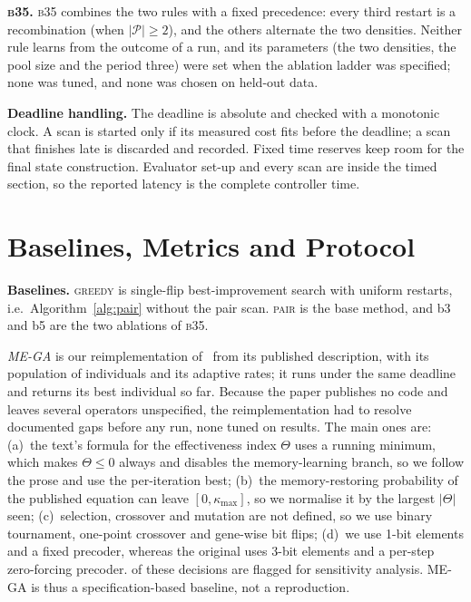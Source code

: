 \documentclass[runningheads]{llncs}
\newcommand{\bts}{\textsc{b35}}
\begin{document}
\textbf{\bts{}.} \bts{} combines the two rules with a fixed precedence: every third restart is a recombination (when $|\mathcal P|\ge2$), and the others alternate the two densities. Neither rule learns from the outcome of a run, and its parameters (the two densities, the pool size and the period three) were set when the ablation ladder was specified; none was tuned, and none was chosen on held-out data.

\textbf{Deadline handling.} The deadline is absolute and checked with a monotonic clock. A scan is started only if its measured cost fits before the deadline; a scan that finishes late is discarded and recorded. Fixed time reserves keep room for the final state construction. Evaluator set-up and every scan are inside the timed section, so the reported latency is the complete controller time.

\section{Baselines, Metrics and Protocol}\label{sec:protocol}
\textbf{Baselines.} \textsc{greedy} is single-flip best-improvement search with uniform restarts, i.e.\ Algorithm~\ref{alg:pair} without the pair scan. \textsc{pair} is the base method, and b3 and b5 are the two ablations of \bts{}.

\emph{ME-GA} is our reimplementation of~\cite{zardi2024memory} from its published description, with its population of  individuals and its adaptive rates; it runs under the same deadline and returns its best individual so far. Because the paper publishes no code and leaves several operators unspecified, the reimplementation had to resolve  documented gaps before any run, none tuned on results. The main ones are: (a)~the text's formula for the effectiveness index $\Theta$ uses a running minimum, which makes $\Theta\le0$ always and disables the memory-learning branch, so we follow the prose and use the per-iteration best; (b)~the memory-restoring probability of the published equation can leave $[0,\kappa_{\max}]$, so we normalise it by the largest $|\Theta|$ seen; (c)~selection, crossover and mutation are not defined, so we use binary tournament, one-point crossover and gene-wise bit flips; (d)~we use 1-bit elements and a fixed precoder, whereas the original uses 3-bit elements and a per-step zero-forcing precoder.  of these decisions are flagged for sensitivity analysis. ME-GA is thus a specification-based baseline, not a reproduction.
\end{document}
